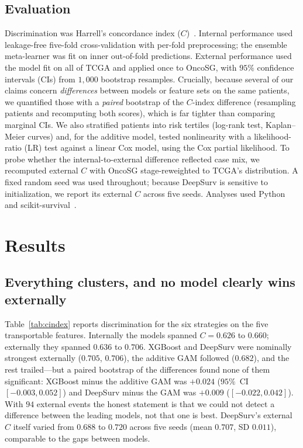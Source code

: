 \documentclass[journal]{IEEEtran}
\begin{document}
\subsection{Evaluation}
Discrimination was Harrell's concordance index ($C$)~\cite{harrell1996}.
Internal performance used leakage-free five-fold cross-validation with per-fold
preprocessing; the ensemble meta-learner was fit on inner out-of-fold
predictions. External performance used the model fit on all of TCGA and applied
once to OncoSG, with $95\%$ confidence intervals (CIs) from $1{,}000$ bootstrap
resamples. Crucially, because several of our claims concern \emph{differences}
between models or feature sets on the same patients, we quantified those with a
\emph{paired} bootstrap of the $C$-index difference (resampling patients and
recomputing both scores), which is far tighter than comparing marginal CIs. We
also stratified patients into risk tertiles (log-rank test, Kaplan--Meier
curves) and, for the additive model, tested nonlinearity with a
likelihood-ratio (LR) test against a linear Cox model, using the Cox partial
likelihood. To probe whether the internal-to-external difference reflected case
mix, we recomputed external $C$ with OncoSG stage-reweighted to TCGA's
distribution. A fixed random seed was used throughout; because DeepSurv is
sensitive to initialization, we report its external $C$ across five seeds.
Analyses used Python and scikit-survival~\cite{polsterl2020}.

\section{Results}

\subsection{Everything clusters, and no model clearly wins externally}
Table~\ref{tab:cindex} reports discrimination for the six strategies on the five
transportable features. Internally the models spanned $C=0.626$ to $0.660$;
externally they spanned $0.636$ to $0.706$. XGBoost and DeepSurv were nominally
strongest externally ($0.705$, $0.706$), the additive GAM followed ($0.682$),
and the rest trailed---but a paired bootstrap of the differences found none of
them significant: XGBoost minus the additive GAM was $+0.024$
($95\%$~CI~$[-0.003,0.052]$) and DeepSurv minus the GAM was $+0.009$
($[-0.022,0.042]$). With $94$ external events the honest statement is that we
could not detect a difference between the leading models, not that one is best.
DeepSurv's external $C$ itself varied from $0.688$ to $0.720$ across five seeds
(mean $0.707$, SD $0.011$), comparable to the gaps between models.
\end{document}
